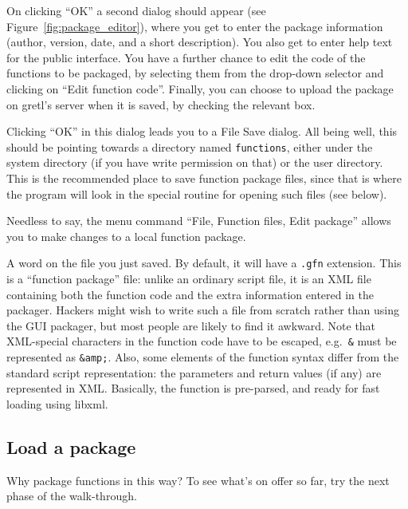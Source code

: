 On clicking ``OK'' a second dialog should appear (see
Figure~\ref{fig:package_editor}), where you get to enter the package
information (author, version, date, and a short description).  You
also get to enter help text for the public interface.  You have a
further chance to edit the code of the functions to be packaged, by
selecting them from the drop-down selector and clicking on ``Edit
function code''. Finally, you can choose to upload the package on
gretl's server when it is saved, by checking the relevant box.

Clicking ``OK'' in this dialog leads you to a File Save dialog.  All
being well, this should be pointing towards a directory named
\texttt{functions}, either under the  system directory (if
you have write permission on that) or the  user directory.
This is the recommended place to save function package files, since
that is where the program will look in the special routine for opening
such files (see below).

Needless to say, the menu command ``File, Function files, Edit package''
allows you to make changes to a local function package.

\vspace{6pt}

A word on the file you just saved.  By default, it will have a
\texttt{.gfn} extension.  This is a ``function package'' file: unlike
an ordinary  script file, it is an XML file containing both
the function code and the extra information entered in the packager.
Hackers might wish to write such a file from scratch rather than using
the GUI packager, but most people are likely to find it awkward.  Note
that XML-special characters in the function code have to be escaped,
e.g.\ \texttt{\&} must be represented as \texttt{\&amp;}.  Also, some
elements of the function syntax differ from the standard script
representation: the parameters and return values (if any) are
represented in XML.  Basically, the function is pre-parsed, and ready
for fast loading using \textsf{libxml}.

\vspace{6pt}

\subsection{Load a package}

Why package functions in this way?  To see what's on offer so far, try
the next phase of the walk-through.


